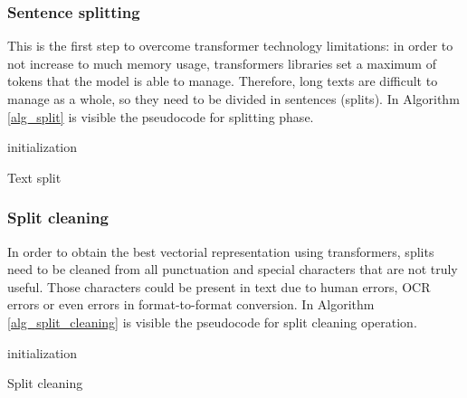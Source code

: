 \documentclass[\main/main.tex]{subfiles}
\begin{document}
\subsubsection{Sentence splitting}
This is the first step to overcome transformer technology limitations: in order to not increase to much memory usage, transformers libraries set a maximum of tokens that the model is able to manage. Therefore, long texts are difficult to manage as a whole, so they need to be divided in sentences (splits). In Algorithm \ref{alg_split} is visible the pseudocode for splitting phase.
\begin{center}
    \begin{algorithm}[H]
     initialization \\
     \caption{Text split}
     \label{alg_split}
    \end{algorithm}
\end{center}
\subsubsection{Split cleaning}
In order to obtain the best vectorial representation using transformers, splits need to be cleaned from all punctuation and special characters that are not truly useful. Those characters could be present in text due to human errors, OCR errors or even errors in format-to-format conversion. In Algorithm \ref{alg_split_cleaning} is visible the pseudocode for split cleaning operation.
\begin{center}
    \begin{algorithm}[H]
     initialization \\
     \caption{Split cleaning}
     \label{alg_split_cleaning}
    \end{algorithm}
\end{center}
\end{document}
